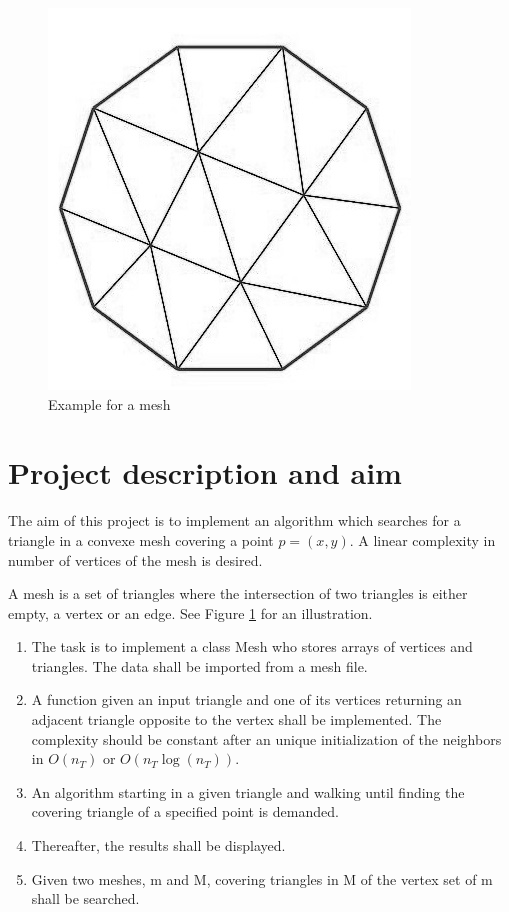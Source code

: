 \documentclass[10pt]{article}
\begin{document}
\begin{figure} 
	\begin{center}
		\includegraphics[width=0.6\linewidth]{../Figures/ex_mesh}
	\end{center}
	\caption{Example for a mesh}
	\label{fig:ex_mesh}
\end{figure}

\section{Project description and aim}

The aim of this project is to implement an algorithm which searches for a triangle in a convexe mesh covering a point $p = (x,y)$. A linear complexity in number of vertices of the mesh is desired.

A mesh is a set of triangles where the intersection of two triangles is either empty, a vertex or an edge. See Figure \ref{fig:ex_mesh} for an illustration.

\begin{enumerate}
	\item The task is to implement a class {\ttfamily Mesh} who stores arrays of vertices and triangles. The data shall be imported from a mesh file.
	\item A function given an input triangle and one of its vertices returning an adjacent triangle opposite to the vertex shall be implemented. The complexity should be constant after an unique initialization  of the neighbors in $O(n_T)$ or $O(n_T \log(n_T))$.
	\item An algorithm starting in a given triangle and walking until finding the covering triangle of a specified point is demanded.
	\item Thereafter, the results shall be displayed.
	\item Given two meshes, {\ttfamily m} and {\ttfamily M}, covering triangles in {\ttfamily M} of the vertex set of {\ttfamily m} shall be searched.
\end{enumerate}
\end{document}
